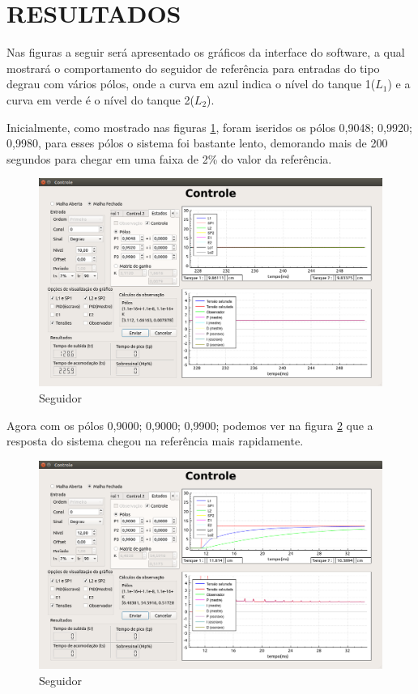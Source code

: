 \documentclass[a4paper,12pt]{article}
\begin{document}
\section{RESULTADOS}
\hspace{4ex}Nas figuras a seguir será apresentado os gráficos da interface do software, a qual mostrará o comportamento do seguidor de referência para entradas do tipo degrau com vários pólos, onde a curva em azul indica o nível do tanque 1($L_1$) e a curva em verde é o nível do tanque 2($L_2$).

\hspace{4ex}Inicialmente, como mostrado nas figuras \ref{img1}, foram iseridos os pólos 0,9048; 0,9920; 0,9980, para esses pólos o sistema foi bastante lento, demorando mais de 200 segundos para chegar em uma faixa de 2\% do valor da referência.
\begin{figure}[H]
\centering
\includegraphics[width=13cm]{FotosSeguidor/PolosDados.png}
\caption{Seguidor}
\label{img1}
\end{figure}

\hspace{4ex}Agora com os pólos 0,9000; 0,9000; 0,9900; podemos ver na figura \ref{img3} que a resposta do sistema chegou na referência mais rapidamente.
\begin{figure}[!h]
\centering
\includegraphics[width=13cm]{FotosSeguidor/Bom}
\caption{Seguidor}
\label{img3}
\end{figure}
\end{document}
